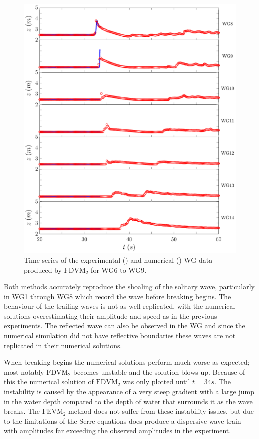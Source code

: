 \begin{figure}
	\centering
	\includegraphics[width=\textwidth]{./chp6/figures/Experiment/Roeber/Trial8/FDVM/LongWGs2.pdf}
	\caption{Time series of the experimental () and numerical ({\color{blue}\solidrule}) WG data produced by $\text{FDVM}_2$ for WG6 to WG9.}
	\label{fig:Roeber8WG6to9FDVM}
\end{figure} 

Both methods accurately reproduce the shoaling of the solitary wave, particularly in WG1 through WG8 which record the wave before breaking begins. The behaviour of the trailing waves is not as well replicated, with the numerical solutions overestimating their amplitude and speed as in the previous experiments. The reflected wave can also be observed in the WG and since the numerical simulation did not have reflective boundaries these waves are not replicated in their numerical solutions.

When breaking begins the numerical solutions perform much worse as expected; most notably $\text{FDVM}_2$ becomes unstable and the solution blows up. Because of this the numerical solution of $\text{FDVM}_2$ was only plotted until $t = 34s$. The instability is caused by the appearance of a very steep gradient with a large jump in the water depth compared to the depth of water that surrounds it as the wave breaks. The $\text{FEVM}_2$ method does not suffer from these instability issues, but due to the limitations of the Serre equations does produce a dispersive wave train with amplitudes far exceeding the observed amplitudes in the experiment. 

